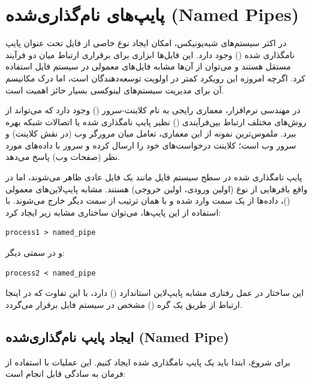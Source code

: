 \section{پایپ‌های نام‌گذاری‌شده (Named Pipes)}

در اکثر سیستم‌های شبه‌یونیکس، امکان ایجاد نوع خاصی از فایل تحت عنوان پایپ نامگذاری شده () وجود دارد. این فایل‌ها ابزاری برای برقراری ارتباط میان دو فرآیند مستقل هستند و می‌توان از آن‌ها مشابه فایل‌های معمولی در سیستم فایل استفاده کرد. اگرچه امروزه این رویکرد کمتر در اولویت توسعه‌دهندگان است، اما درک مکانیسم آن برای مدیریت سیستم‌های لینوکسی بسیار حائز اهمیت است.

در مهندسی نرم‌افزار، معماری رایجی به نام کلاینت-سرور () وجود دارد که می‌تواند از روش‌های مختلف ارتباط بین‌فرآیندی () نظیر پایپ نامگذاری شده یا اتصالات شبکه بهره ببرد. ملموس‌ترین نمونه از این معماری، تعامل میان مرورگر وب (در نقش کلاینت) و سرور وب است؛ کلاینت درخواست‌های خود را ارسال کرده و سرور با داده‌های مورد نظر (صفحات وب) پاسخ می‌دهد.

پایپ نامگذاری شده در سطح سیستم فایل مانند یک فایل عادی ظاهر می‌شوند، اما در واقع بافرهایی از نوع  (اولین ورودی، اولین خروجی) هستند. مشابه پایپ‌لاین‌های معمولی ()، داده‌ها از یک سمت وارد شده و با همان ترتیب از سمت دیگر خارج می‌شوند. با استفاده از این پایپ‌ها، می‌توان ساختاری مشابه زیر ایجاد کرد:

\begin{latin}
\begin{lstlisting}
process1 > named_pipe
\end{lstlisting}
\end{latin}

و در سمتی دیگر:

\begin{latin}
\begin{lstlisting}
process2 < named_pipe
\end{lstlisting}
\end{latin}

این ساختار در عمل رفتاری مشابه پایپ‌لاین استاندارد () دارد، با این تفاوت که در اینجا ارتباط از طریق یک گره () مشخص در سیستم فایل برقرار می‌گردد.

\subsection{ایجاد پایپ نام‌گذاری‌شده (Named Pipe)}

برای شروع، ابتدا باید یک پایپ نامگذاری شده ایجاد کنیم. این عملیات با استفاده از فرمان  به سادگی قابل انجام است:

